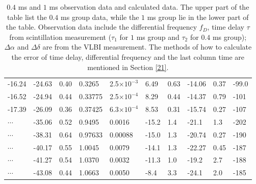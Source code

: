 \documentclass[useAMS,usenatbib]{mn2e}
\providecommand{\e}[1]{\ensuremath{\times 10^{#1}}}
\begin{document}
\begin{table}
\begin{tabular}{llllllllll}
-16.24   &-24.63                            & 0.40       & 0.3265  & 2.5\e{-3}          & 6.49    & 0.63                                     & -14.06    & 0.37       &-99.0                                \\

-16.52  &-24.94                            & 0.44      & 0.33775 & 2.5\e{-4}         & 8.29    & 0.44                                     & -14.37    & 0.79      &-101                                \\

-17.39   &-26.09                            & 0.36      & 0.37425 & 6.3\e{-4}         & 8.53    & 0.31                                     & -15.74    & 0.27      &-107                               
\\ \hline
$\cdots$&         -35.06                           & 0.52                               & 0.9495               & 0.0016                              & -15.2  & 1.4                                     & -21.1   & 1.3   &-202                                   \\
$\cdots$ & -38.31                           & 0.64                               & 0.97633              & 0.00088                             & -15.0  & 1.3                                    & -20.74   & 0.27  &-190                                    \\
$\cdots$ & -40.17                           & 0.55                               & 1.0045              & 0.0079                             & -14.1  & 1.3                                    & -22.27   & 0.45  &-187                                   \\

$\cdots$ & -41.27                           & 0.54                               & 1.0370              & 0.0032                              & -11.3  & 1.0                                     & -19.2   & 2.7   &-188                                   \\

$ \cdots$ & -43.08                           & 0.44                               & 1.0663              & 0.0050                              & -8.4   & 3.3                                      & -24.1   & 2.0   &-185   \\
 \hline                                 
\end{tabular}
\caption{ $0.4$ ms and $1$ ms observation data and calculated data. 
The upper part of the table list the $0.4$ ms group data, while the $1$ ms group lie in the lower part of the table. 
Observation data include the differential frequency $f_D$, time delay $\tau$ from scintillation measurement ($\tau_1$ for $1$ ms group and $\tau_2$ for $0.4$ ms group); $\Delta\alpha$ and $\Delta\delta$ are from the VLBI measurement. The methods of how to calculate the error of time delay, differential frequency and the last column time are mentioned in Section \ref{21}.}
\label{table:apex}
\end{table}
\end{document}
